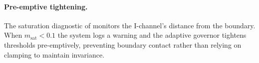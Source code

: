 \documentclass[11pt,twocolumn]{article}
\begin{document}
\paragraph{Pre-emptive tightening.}
The saturation diagnostic of  monitors the
I-channel's distance from the boundary. When $m_{\text{sat}} < 0.1$
the system logs a warning and the adaptive governor tightens
thresholds pre-emptively, preventing boundary contact rather than
relying on clamping to maintain invariance.
\end{document}
